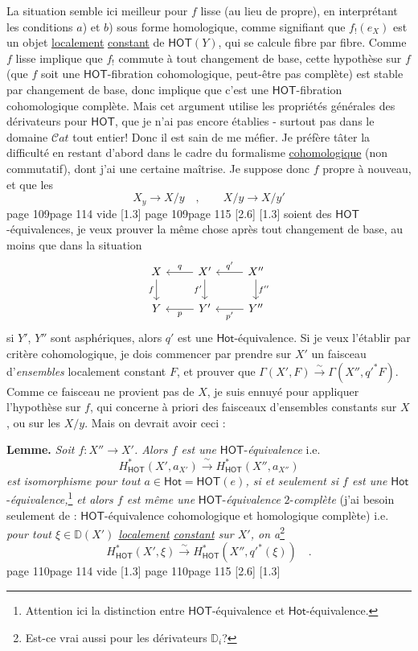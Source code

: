 \documentclass[11pt,leqno]{article}
\newcommand{\printedpage}[1]{\marginnote{\scriptsize\sffamily ed.\ #1}}
\newcommand{\msp}[1]{%
  \begingroup\def\thismsp{#1}\def\blankmsp{page 114 vide}%
  \ifx\thismsp\blankmsp
    \marginnote{\scriptsize\sffamily [114: vide]}[1.3\baselineskip]%
  \else\def\followingmsp{page 115}%
    \ifx\thismsp\followingmsp
      \marginnote{\scriptsize\sffamily [page 115]}[2.6\baselineskip]%
    \else\marginnote{\scriptsize\sffamily [#1]}[1.3\baselineskip]\fi
  \fi\endgroup}
\newcommand{\DD}{\ensuremath{\mathbb{D}}}
\newcommand{\Hot}{\ensuremath{\mathsf{Hot}}}
\newcommand{\HOT}{\ensuremath{\mathsf{HOT}}}
\newcommand{\Cat}{\ensuremath{\mathcal{C}at}}
\begin{document}
La situation semble ici meilleur pour $f$ lisse (au lieu de propre), en interprétant les conditions $a$) et $b$) sous forme homologique, comme signifiant que $f_!(e_X)$ est un objet \underline{localement} \underline{constant} de $\mathsf{HOT}(Y)$, qui se calcule fibre par fibre. Comme $f$ lisse implique que $f_!$ commute à tout changement de base, cette hypothèse sur $f$ (que $f$ soit une \HOT-fibration cohomologique, peut-être pas complète) est stable par changement de base, donc implique que c'est une \HOT-fibration cohomologique complète. Mais cet argument utilise les propriétés générales des dérivateurs pour \HOT, que je n'ai pas encore établies - surtout pas dans le domaine $\Cat$ tout entier! Donc il est sain de me méfier. Je préfère tâter la difficulté en restant d'abord dans le cadre du formalisme \underline{cohomologique} (non commutatif), dont j'ai une certaine maîtrise. Je suppose donc $f$ propre à nouveau, et que les %
\[ X_y \longrightarrow X/y \quad , \qquad X/y \longrightarrow X/y' \]
\msp{page 109}
soient des \HOT-équivalences, je veux prouver la même chose après tout changement de base, au moins que dans la situation
\[
\begin{tikzcd}
X \arrow[r, leftarrow, "q"] \arrow[d, "f"'] & X' \arrow[r, leftarrow, "q'"] \arrow[d, "f'"'] & X'' \arrow[d, "f''"] \\
Y \arrow[r, leftarrow, "p"'] & Y' \arrow[r, leftarrow, "p'"'] & Y''
\end{tikzcd}
\]
\printedpage{65}
si $Y'$, $Y''$ sont asphériques, alors $q'$ est une \Hot-équivalence. Si je veux l'établir par critère cohomologique, je dois commencer par prendre sur $X'$ un faisceau d'\textit{ensembles} localement constant $F$, et prouver que $\Gamma(X',F) \overset{\sim}{\to} \Gamma(X'',{q'}^{*}F)$. Comme ce faisceau ne provient pas de $X$, je suis ennuyé pour appliquer l'hypothèse sur $f$, qui concerne à priori des faisceaux d'ensembles constants sur $X$, ou sur les $X/y$. Mais on devrait avoir ceci :

\textbf{Lemme.} \textit{Soit $f : X'' \to X'$. Alors $f$ est une} \HOT-\textit{équivalence} i.e.
\[ H^{*}_{\mathsf{HOT}}(X', a_{X'}) \xrightarrow{\ \sim\ } H^{*}_{\mathsf{HOT}}(X'', a_{X''}) \]
\textit{est} \textit{isomorphisme pour tout $a \in \mathsf{Hot} = \mathsf{HOT}(e)$, si et seulement si $f$ est une} \Hot-\textit{équivalence,}\footnote[56]{Attention ici la distinction entre \HOT-équivalence et \Hot-équivalence.} \textit{et alors $f$ est même une} \HOT-\textit{équivalence} $2$-\textit{complète} (j'ai besoin seulement de : \HOT-équivalence cohomologique et homologique complète) i.e. \textit{pour tout $\xi \in \DD(X')$ \underline{localement} \underline{constant} sur $X'$, on a}\footnote[57]{Est-ce vrai aussi pour les dérivateurs $\DD_i$?}
\[ H^{*}_{\mathsf{HOT}}(X',\xi) \xrightarrow{\ \sim\ } H^{*}_{\mathsf{HOT}}(X'',{q'}^{*}(\xi)) \quad . \]
\msp{page 110}
\end{document}
